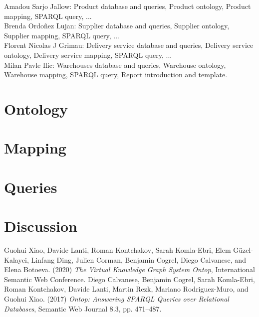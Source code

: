 \documentclass{article}
\begin{document}
\noindent Amadou Sarjo Jallow: Product database and queries, Product ontology, Product mapping, SPARQL query, ...
\\

\noindent Brenda Ordoñez Lujan: Supplier database and queries, Supplier ontology, Supplier mapping, SPARQL query, ...
\\

\noindent Florent Nicolas J Grimau: Delivery service database and queries, Delivery service ontology, Delivery service mapping, SPARQL query, ...
\\

\noindent Milan Pavle Ilic: Warehouses database and queries, Warehouse ontology, Warehouse mapping, SPARQL query, Report introduction and template.



\section{Ontology}


\section{Mapping}


\section{Queries}


\section{Discussion}



\begin{thebibliography}{99}
Guohui Xiao, Davide Lanti, Roman Kontchakov, Sarah Komla-Ebri, Elem Güzel-Kalayci, Linfang Ding, Julien Corman, Benjamin Cogrel, Diego Calvanese, and Elena Botoeva. (2020) \emph{The Virtual Knowledge Graph System Ontop}, International Semantic Web Conference.
Diego Calvanese, Benjamin Cogrel, Sarah Komla-Ebri, Roman Kontchakov, Davide Lanti, Martin Rezk, Mariano Rodriguez-Muro, and Guohui Xiao. (2017) \emph{Ontop: Answering SPARQL Queries over Relational Databases}, Semantic Web Journal 8.3, pp. 471–487.
\end{thebibliography}
\end{document}
